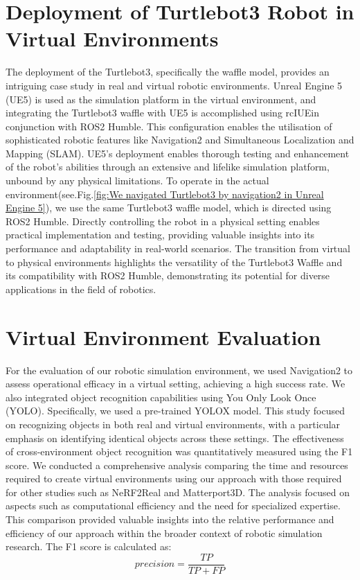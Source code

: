 \section{Deployment of Turtlebot3 Robot in Virtual Environments}
\label{sec:Deployment of Turtlebot3 Robot in Virtual  Environments}
\singlespacing
The deployment of the Turtlebot3, specifically the waffle model, provides an intriguing case study in real and virtual robotic environments. Unreal Engine 5 (UE5) is used as the simulation platform in the virtual environment, and integrating the Turtlebot3 waffle with UE5 is accomplished using rcIUE\cite{rapyuta2023rclue}in conjunction with ROS2 Humble. This configuration enables the utilisation of sophisticated robotic features like Navigation2 and Simultaneous Localization and Mapping (SLAM). UE5's deployment enables thorough testing and enhancement of the robot's abilities through an extensive and lifelike simulation platform, unbound by any physical limitations.
\singlespacing
To operate in the actual environment(see.Fig.\ref{fig:We navigated Turtlebot3 by navigation2  in Unreal Engine 5}), we use the same Turtlebot3 waffle model, which is directed using ROS2 Humble. Directly controlling the robot in a physical setting enables practical implementation and testing, providing valuable insights into its performance and adaptability in real-world scenarios. The transition from virtual to physical environments highlights the versatility of the Turtlebot3 Waffle and its compatibility with ROS2 Humble, demonstrating its potential for diverse applications in the field of robotics.
\singlespacing
\section{Virtual Environment Evaluation}
\label{sec:Virtual Environment Evaluation}
\singlespacing
For the evaluation of our robotic simulation environment, we used Navigation2 to assess operational efficacy in a virtual setting, achieving a high success rate. We also integrated object recognition capabilities using You Only Look Once (YOLO). Specifically, we used a pre-trained YOLOX\cite{ge2021yolox} model. This study focused on recognizing objects in both real and virtual environments, with a particular emphasis on identifying identical objects across these settings. The effectiveness of cross-environment object recognition was quantitatively measured using the F1 score. We conducted a comprehensive analysis comparing the time and resources required to create virtual environments using our approach with those required for other studies such as NeRF2Real\cite{byravan2023nerf2real} and Matterport3D\cite{chang2017matterport3d}. The analysis focused on aspects such as computational efficiency and the need for specialized expertise. This comparison provided valuable insights into the relative performance and efficiency of our approach within the broader context of robotic simulation research.
\singlespacing
The F1 score is calculated as:
\begin{equation}
  precision = \frac{TP}{TP + FP}
\end{equation}
  
